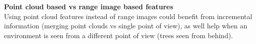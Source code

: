 \documentclass[a0paper,portrait]{baposter}
\begin{document}
\begin{poster}
{        \textbf{Point cloud based vs range image based features}\\
        Using point cloud features instead of range images could benefit from incremental information (merging point clouds vs single point of view), as well help when an environment is seen from a different point of view (trees seen from behind).
    }


\end{poster}
\end{document}
